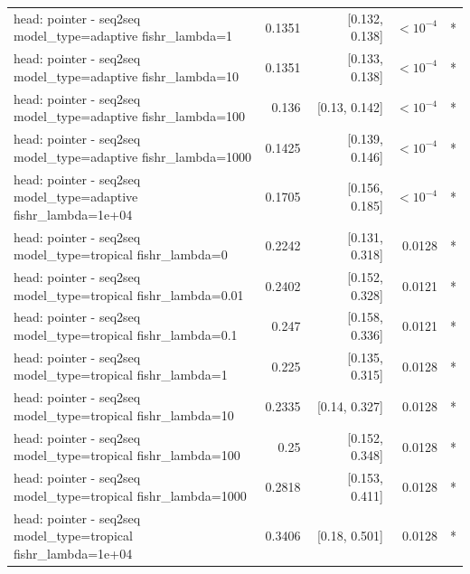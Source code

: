 \documentclass[10pt]{article}
\makeatletter
\newcommand{\stackcell}[1]{\begin{tabular}[t]{@{}l@{}}#1\end{tabular}}
\makeatother
\begin{document}
{\begin{longtable}{lrrrl}
\stackcell{head: pointer - seq2seq\\\footnotesize model\_type=adaptive fishr\_lambda=1 } & 0.1351 & [0.132, 0.138] & $<10^{-4}$ & *\\
\stackcell{head: pointer - seq2seq\\\footnotesize model\_type=adaptive fishr\_lambda=10 } & 0.1351 & [0.133, 0.138] & $<10^{-4}$ & *\\
\stackcell{head: pointer - seq2seq\\\footnotesize model\_type=adaptive fishr\_lambda=100 } & 0.136 & [0.13, 0.142] & $<10^{-4}$ & *\\
\stackcell{head: pointer - seq2seq\\\footnotesize model\_type=adaptive fishr\_lambda=1000 } & 0.1425 & [0.139, 0.146] & $<10^{-4}$ & *\\
\stackcell{head: pointer - seq2seq\\\footnotesize model\_type=adaptive fishr\_lambda=1e+04 } & 0.1705 & [0.156, 0.185] & $<10^{-4}$ & *\\
\stackcell{head: pointer - seq2seq\\\footnotesize model\_type=tropical fishr\_lambda=0 } & 0.2242 & [0.131, 0.318] & 0.0128 & *\\
\stackcell{head: pointer - seq2seq\\\footnotesize model\_type=tropical fishr\_lambda=0.01 } & 0.2402 & [0.152, 0.328] & 0.0121 & *\\
\stackcell{head: pointer - seq2seq\\\footnotesize model\_type=tropical fishr\_lambda=0.1 } & 0.247 & [0.158, 0.336] & 0.0121 & *\\
\stackcell{head: pointer - seq2seq\\\footnotesize model\_type=tropical fishr\_lambda=1 } & 0.225 & [0.135, 0.315] & 0.0128 & *\\
\stackcell{head: pointer - seq2seq\\\footnotesize model\_type=tropical fishr\_lambda=10 } & 0.2335 & [0.14, 0.327] & 0.0128 & *\\
\stackcell{head: pointer - seq2seq\\\footnotesize model\_type=tropical fishr\_lambda=100 } & 0.25 & [0.152, 0.348] & 0.0128 & *\\
\stackcell{head: pointer - seq2seq\\\footnotesize model\_type=tropical fishr\_lambda=1000 } & 0.2818 & [0.153, 0.411] & 0.0128 & *\\
\stackcell{head: pointer - seq2seq\\\footnotesize model\_type=tropical fishr\_lambda=1e+04 } & 0.3406 & [0.18, 0.501] & 0.0128 & *\\

\end{longtable}}
\end{document}
